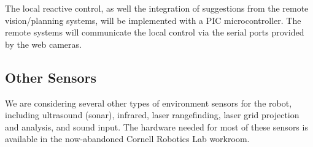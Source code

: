 \documentclass[12pt]{article}
\begin{document}
The local reactive control, as well the integration of suggestions from the remote vision/planning systems, will be implemented with a PIC microcontroller.  The remote systems will communicate the local control via the serial ports provided by the web cameras.


\subsection{Other Sensors}

We are considering several other types of environment sensors for the robot, including ultrasound (sonar), infrared, laser rangefinding, laser grid projection
and analysis, and sound input.  The hardware needed for most of these sensors is available in the now-abandoned Cornell Robotics Lab workroom.
\end{document}
